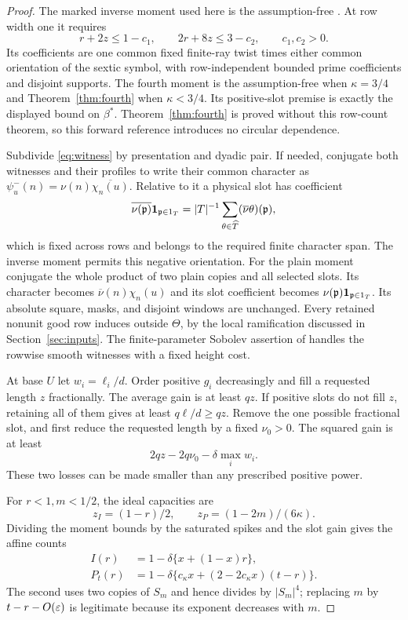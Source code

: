 \begin{proof}
The marked inverse moment used here is the assumption-free . At row width one it requires
\[
 r+2z\le1-c_1,\qquad 2r+8z\le3-c_2,\qquad c_1,c_2>0.
\]
Its coefficients are one common fixed finite-ray twist times either common orientation of the sextic symbol, with row-independent bounded prime coefficients and disjoint supports. The fourth moment is the assumption-free  when $\kappa=3/4$ and Theorem~\ref{thm:fourth} when $\kappa<3/4$. Its positive-slot premise is exactly the displayed bound on $\beta^*$. Theorem~\ref{thm:fourth} is proved without this row-count theorem, so this forward reference introduces no circular dependence.

Subdivide \eqref{eq:witness} by presentation and dyadic pair. If needed, conjugate both witnesses and their profiles to write their common character as $\psi_u^-(n)=\nu(n)\overline{\chi_n(u)}$. Relative to it a physical slot has coefficient
\[
 \overline{\nu(\mathfrak p)}\mathbf 1_{\mathfrak p\in1_T}
   =|T|^{-1}\sum_{\theta\in\widehat T}(\overline\nu\theta)(\mathfrak p),
\]
which is fixed across rows and belongs to the required finite character span. The inverse moment permits this negative orientation. For the plain moment conjugate the whole product of two plain copies and all selected slots. Its character becomes $\overline\nu(n)\chi_n(u)$ and its slot coefficient becomes $\nu(\mathfrak p)\mathbf 1_{\mathfrak p\in1_T}$. Its absolute square, masks, and disjoint windows are unchanged. Every retained nonunit good row induces outside $\Theta$, by the local ramification discussed in Section~\ref{sec:inputs}. The finite-parameter Sobolev assertion of  handles the rowwise smooth witnesses with a fixed height cost.

At base $U$ let $w_i=\ell_i/d$. Order positive $g_i$ decreasingly and fill a requested length $z$ fractionally. The average gain is at least $qz$. If positive slots do not fill $z$, retaining all of them gives at least $q\ell/d\ge qz$. Remove the one possible fractional slot, and first reduce the requested length by a fixed $\nu_0>0$. The squared gain is at least
\[
 2qz-2q\nu_0-\delta\max_i w_i.
\]
These two losses can be made smaller than any prescribed positive power.

For $r<1,m<1/2$, the ideal capacities are
\[
 z_I=(1-r)/2,\qquad z_P=(1-2m)/(6\kappa).
\]
Dividing the moment bounds by the saturated spikes and the slot gain gives the affine counts
\begin{align*}
 I(r)&=1-\delta\{x+(1-x)r\},\\
 P_t(r)&=1-\delta\{c_\kappa x+(2-2c_\kappa x)(t-r)\}.
\end{align*}
The second uses two copies of $S_m$ and hence divides by $|S_m|^4$; replacing $m$ by $t-r-O(\varepsilon)$ is legitimate because its exponent decreases with $m$.


\end{proof}
